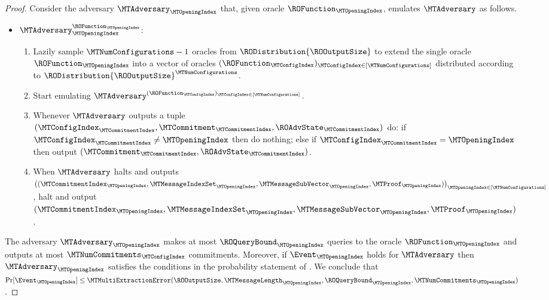 \begin{proof}
Consider the adversary $\MTAdversary_{\MTOpeningIndex}$ that, given oracle $\ROFunction_{\MTOpeningIndex}$, emulates $\MTAdversary$ as follows.
\begin{itemize}[noitemsep]
\item[] $\MTAdversary_{\MTOpeningIndex}^{\ROFunction_{\MTOpeningIndex}}$:
\begin{enumerate}[nolistsep]
  \item Lazily sample $\MTNumConfigurations-1$ oracles from $\RODistribution{\ROOutputSize}$ to extend the single oracle $\ROFunction_{\MTOpeningIndex}$ into a vector of oracles $(\ROFunction_{\MTConfigIndex})_{\MTConfigIndex \in [\MTNumConfigurations]}$ distributed according to $\RODistribution{\ROOutputSize}^{\MTNumConfigurations}$.
  \item Start emulating $\MTAdversary^{(\ROFunction_{\MTConfigIndex})_{\MTConfigIndex \in [\MTNumConfigurations]}}$.
  \item Whenever $\MTAdversary$ outputs a tuple $(\MTConfigIndex_{\MTCommitmentIndex},\MTCommitment_{\MTCommitmentIndex},\ROAdvState_{\MTCommitmentIndex})$ do: if $\MTConfigIndex_{\MTCommitmentIndex} \neq \MTOpeningIndex$ then do nothing; else if $\MTConfigIndex_{\MTCommitmentIndex} = \MTOpeningIndex$ then output $(\MTCommitment_{\MTCommitmentIndex},\ROAdvState_{\MTCommitmentIndex})$.
  \item When $\MTAdversary$ halts and outputs $\big((\MTCommitmentIndex_{\MTOpeningIndex}, \MTMessageIndexSet_{\MTOpeningIndex},\MTMessageSubVector_{\MTOpeningIndex},\MTProof_{\MTOpeningIndex})\big)_{\MTOpeningIndex \in [\MTNumConfigurations]}$, halt and output $(\MTCommitmentIndex_{\MTOpeningIndex}, \MTMessageIndexSet_{\MTOpeningIndex},\MTMessageSubVector_{\MTOpeningIndex},\MTProof_{\MTOpeningIndex})$.
\end{enumerate}
\end{itemize}
The adversary $\MTAdversary_{\MTOpeningIndex}$ makes at most $\ROQueryBound_{\MTOpeningIndex}$ queries to the oracle $\ROFunction_{\MTOpeningIndex}$ and outputs at most $\MTNumCommitments_{\MTConfigIndex}$ commitments. Moreover, if $\Event_{\MTOpeningIndex}$ holds for $\MTAdversary$ then $\MTAdversary_{\MTOpeningIndex}$ satisfies the conditions in the probability statement of . We conclude that $\Pr[\Event_{\MTOpeningIndex}] \leq \MTMultiExtractionError(\ROOutputSize,\MTMessageLength_{\MTOpeningIndex},\ROQueryBound_{\MTOpeningIndex},\MTNumCommitments_{\MTOpeningIndex})$.
\end{proof}

